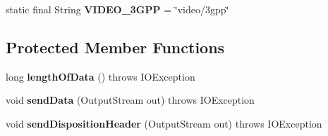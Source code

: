 \begin{DoxyCompactItemize}
\item 
\hypertarget{classcom_1_1bluevia_1_1commons_1_1connector_1_1http_1_1multipart_1_1BlueviaPartBase_acb4fcdc33e86d4272a07c3fa16eaa32b}{
static final String {\bfseries VIDEO\_\-3GPP} = \char`\"{}video/3gpp\char`\"{}}
\label{classcom_1_1bluevia_1_1commons_1_1connector_1_1http_1_1multipart_1_1BlueviaPartBase_acb4fcdc33e86d4272a07c3fa16eaa32b}

\end{DoxyCompactItemize}
\subsection*{Protected Member Functions}
\begin{DoxyCompactItemize}
\item 
\hypertarget{classcom_1_1bluevia_1_1commons_1_1connector_1_1http_1_1multipart_1_1BlueviaPartBase_a253b70c5242fea0106f787aa5c902163}{
long {\bfseries lengthOfData} ()  throws IOException }
\label{classcom_1_1bluevia_1_1commons_1_1connector_1_1http_1_1multipart_1_1BlueviaPartBase_a253b70c5242fea0106f787aa5c902163}

\item 
\hypertarget{classcom_1_1bluevia_1_1commons_1_1connector_1_1http_1_1multipart_1_1BlueviaPartBase_ae8a14b633ef29085a590d25ee641f2bd}{
void {\bfseries sendData} (OutputStream out)  throws IOException }
\label{classcom_1_1bluevia_1_1commons_1_1connector_1_1http_1_1multipart_1_1BlueviaPartBase_ae8a14b633ef29085a590d25ee641f2bd}

\item 
\hypertarget{classcom_1_1bluevia_1_1commons_1_1connector_1_1http_1_1multipart_1_1BlueviaPartBase_a43ee10e3716e9de247ba7db16f09cf48}{
void {\bfseries sendDispositionHeader} (OutputStream out)  throws IOException }
\label{classcom_1_1bluevia_1_1commons_1_1connector_1_1http_1_1multipart_1_1BlueviaPartBase_a43ee10e3716e9de247ba7db16f09cf48}

\end{DoxyCompactItemize}
